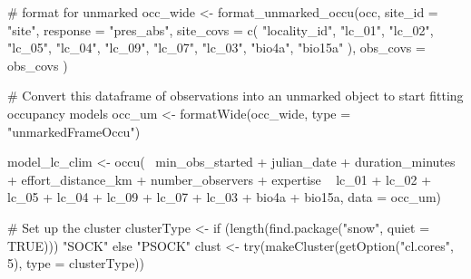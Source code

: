 \documentclass[
]{article}
\newenvironment{Shaded}{}{}
\newcommand{\CommentTok}[1]{\textcolor[rgb]{0.00,0.50,0.00}{#1}}
\newcommand{\ControlFlowTok}[1]{\textcolor[rgb]{0.00,0.00,1.00}{#1}}
\newcommand{\DataTypeTok}[1]{#1}
\newcommand{\DecValTok}[1]{#1}
\newcommand{\KeywordTok}[1]{\textcolor[rgb]{0.00,0.00,1.00}{#1}}
\newcommand{\NormalTok}[1]{#1}
\newcommand{\OperatorTok}[1]{#1}
\newcommand{\OtherTok}[1]{\textcolor[rgb]{1.00,0.25,0.00}{#1}}
\newcommand{\StringTok}[1]{\textcolor[rgb]{0.00,0.50,0.50}{#1}}
\begin{document}
\begin{Shaded}
\begin{Highlighting}[]
{  \CommentTok{# format for unmarked}
\NormalTok{  occ_wide <-}\StringTok{ }\KeywordTok{format_unmarked_occu}\NormalTok{(occ,}
    \DataTypeTok{site_id =} \StringTok{"site"}\NormalTok{,}
    \DataTypeTok{response =} \StringTok{"pres_abs"}\NormalTok{,}
    \DataTypeTok{site_covs =} \KeywordTok{c}\NormalTok{(}
      \StringTok{"locality_id"}\NormalTok{, }\StringTok{"lc_01"}\NormalTok{, }\StringTok{"lc_02"}\NormalTok{, }\StringTok{"lc_05"}\NormalTok{,}
      \StringTok{"lc_04"}\NormalTok{, }\StringTok{"lc_09"}\NormalTok{, }\StringTok{"lc_07"}\NormalTok{, }\StringTok{"lc_03"}\NormalTok{, }\StringTok{"bio4a"}\NormalTok{, }\StringTok{"bio15a"}
\NormalTok{    ),}
    \DataTypeTok{obs_covs =}\NormalTok{ obs_covs}
\NormalTok{  )}

  \CommentTok{# Convert this dataframe of observations into an unmarked object to start fitting occupancy models}
\NormalTok{  occ_um <-}\StringTok{ }\KeywordTok{formatWide}\NormalTok{(occ_wide, }\DataTypeTok{type =} \StringTok{"unmarkedFrameOccu"}\NormalTok{)}

\NormalTok{  model_lc_clim <-}\StringTok{ }\KeywordTok{occu}\NormalTok{(}\OperatorTok{~}\StringTok{ }\NormalTok{min_obs_started }\OperatorTok{+}
\StringTok{    }\NormalTok{julian_date }\OperatorTok{+}
\StringTok{    }\NormalTok{duration_minutes }\OperatorTok{+}
\StringTok{    }\NormalTok{effort_distance_km }\OperatorTok{+}
\StringTok{    }\NormalTok{number_observers }\OperatorTok{+}
\StringTok{    }\NormalTok{expertise }\OperatorTok{~}\StringTok{ }\NormalTok{lc_}\DecValTok{01} \OperatorTok{+}\StringTok{ }\NormalTok{lc_}\DecValTok{02} \OperatorTok{+}\StringTok{ }\NormalTok{lc_}\DecValTok{05} \OperatorTok{+}\StringTok{ }\NormalTok{lc_}\DecValTok{04} \OperatorTok{+}\StringTok{ }\NormalTok{lc_}\DecValTok{09} \OperatorTok{+}\StringTok{ }\NormalTok{lc_}\DecValTok{07} \OperatorTok{+}\StringTok{ }\NormalTok{lc_}\DecValTok{03} \OperatorTok{+}\StringTok{ }
\StringTok{      }\NormalTok{bio4a }\OperatorTok{+}\StringTok{ }\NormalTok{bio15a, }\DataTypeTok{data =}\NormalTok{ occ_um)}

  \CommentTok{# Set up the cluster}
\NormalTok{  clusterType <-}\StringTok{ }\ControlFlowTok{if}\NormalTok{ (}\KeywordTok{length}\NormalTok{(}\KeywordTok{find.package}\NormalTok{(}\StringTok{"snow"}\NormalTok{, }\DataTypeTok{quiet =} \OtherTok{TRUE}\NormalTok{))) }\StringTok{"SOCK"} \ControlFlowTok{else} \StringTok{"PSOCK"}
\NormalTok{  clust <-}\StringTok{ }\KeywordTok{try}\NormalTok{(}\KeywordTok{makeCluster}\NormalTok{(}\KeywordTok{getOption}\NormalTok{(}\StringTok{"cl.cores"}\NormalTok{, }\DecValTok{5}\NormalTok{), }\DataTypeTok{type =}\NormalTok{ clusterType))}

}
\end{Highlighting}
\end{Shaded}
\end{document}
